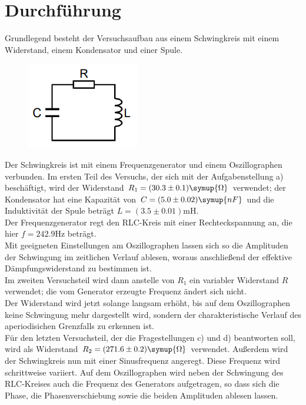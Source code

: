 \section{Durchführung}
\label{sec:Durchführung}
Grundlegend besteht der Versuchsaufbau aus einem Schwingkreis mit einem Widerstand, einem Kondensator und einer Spule.
    \begin{figure}[H]
        \centering
        \includegraphics{RLC.PNG}
    \end{figure}
    Der Schwingkreis ist mit einem Frequenzgenerator und einem Oszillographen verbunden.
    Im ersten Teil des Versuchs, der sich mit der Aufgabenstellung a) beschäftigt, wird der Widerstand $R_1 = (30.3 \pm 0.1) \symup{\Omega}$ verwendet; 
    der Kondensator hat eine Kapazität von $C=(5.0 \pm 0.02) \symup{nF}$ und die Induktivität der Spule beträgt $L= (3.5 \pm 0.01)$mH.\\
    Der Frequenzgenerator regt den RLC-Kreis mit einer Rechteckspannung an, die hier $f=242.9$Hz beträgt.\\
    Mit geeigneten Einstellungen am Oszillographen lassen sich so die Amplituden der Schwingung im zeitlichen Verlauf ablesen, woraus anschließend der effektive Dämpfungswiderstand zu bestimmen ist.\\
    Im zweiten Versuchsteil wird dann anstelle von $R_1$ ein variabler Widerstand $R$ verwendet; die vom Generator erzeugte Frequenz ändert sich nicht.\\
    Der Widerstand wird jetzt solange langsam erhöht, bis auf dem Oszillographen keine Schwingung mehr dargestellt wird, sondern der charakteristische Verlauf des aperiodisichen Grenzfalls zu erkennen ist.\\
    Für den letzten Versuchsteil, der die Fragestellungen c) und d) beantworten soll, wird als Widerstand $R_2 = (271.6 \pm 0.2) \symup{\Omega}$ verwendet.
    Außerdem wird der Schwingkreis nun mit einer Sinusfrequenz angeregt. Diese Frequenz wird schrittweise variiert. Auf dem Oszillographen wird neben der Schwingung des RLC-Kreises auch die Frequenz des Generators aufgetragen,
    so dass sich die Phase, die Phasenverschiebung sowie die beiden Amplituden ablesen lassen.
